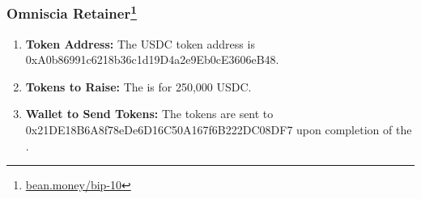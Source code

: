 \documentclass[class=article, crop=false]{standalone}
\begin{document}
\subsubsection[Omniscia Retainer]{Omniscia Retainer\protect \footnote{\href{https://bean.money/bip-10}{bean.money/bip-10}}}
    \begin{enumerate}
        \item \textbf{Token Address:} The USDC token address is 0xA0b86991c6218b36c1d19D4a2e9Eb0cE3606eB48.
        \item \textbf{Tokens to Raise:} The  is for 250,000 USDC.
        \item \textbf{Wallet to Send Tokens:} The tokens are sent to 0x21DE18B6A8f78eDe6D16C50A167f6B222DC08DF7 upon completion of the .
    \end{enumerate}
\end{document}
